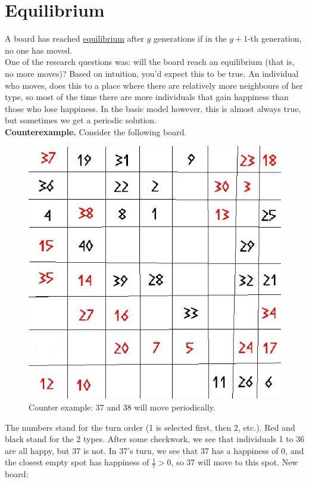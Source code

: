 \documentclass{article}
\begin{document}
\reversemarginpar
\section{Equilibrium}
 A board has reached \underline{equilibrium} after $g$ generations if in the $g+1$-th generation, no one has moved.\\
One of the research questions was: will the board reach an equilibrium (that is, no more moves)? Based on intuition, you'd expect this to be true. An individual who moves, does this to a place where there are relatively more neighbours of her type, so most of the time there are more individuals that gain happiness than those who lose happiness. In the basic model however, this is almost always true, but sometimes we get a periodic solution.\\
\textbf{Counterexample.} Consider the following board.
\begin{figure}[h!]
\begin{center}
\includegraphics[scale=0.3]{segregation_tegenvb.jpg}
\end{center}
\caption{Counter example: 37 and 38 will move periodically.}\label{counterexample}
\end{figure}
The numbers stand for the turn order (1 is selected first, then 2, etc.). Red and black stand for the 2 types. After some checkwork, we see that individuals 1 to 36 are all happy, but 37 is not. In 37's turn, we see that 37 has a happiness of $0$, and the closest empty spot has happiness of $\frac{1}{7} > 0$, so 37 will move to this spot. New board:
\end{document}
